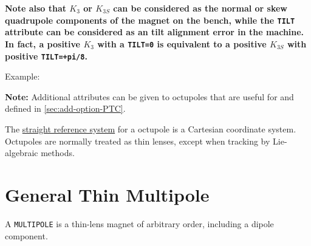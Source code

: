 \textbf{Note also that $K_3$ or $K_{3S}$ can be considered as the normal or
  skew quadrupole components of the magnet on the bench, while the
  \texttt{TILT} attribute can be considered as an tilt alignment error
  in the machine. In fact, a positive $K_3$ with a \texttt{TILT=0} is
  equivalent to a positive $K_{3S}$ with positive \texttt{TILT=+pi/8}.} 

Example: 

\textbf{Note:} Additional attributes can be given to octupoles that
are useful for \ptc and defined in \ref{sec:add-option-PTC}.

The \hyperref[subsec:local-straight]{straight reference system} for a
octupole is a Cartesian coordinate system. Octupoles are normally
treated as thin lenses, except when tracking by Lie-algebraic methods.   



\section{General Thin Multipole}
\label{sec:multipole}

A \texttt{MULTIPOLE} is a thin-lens magnet of arbitrary order, including a 
dipole component.


